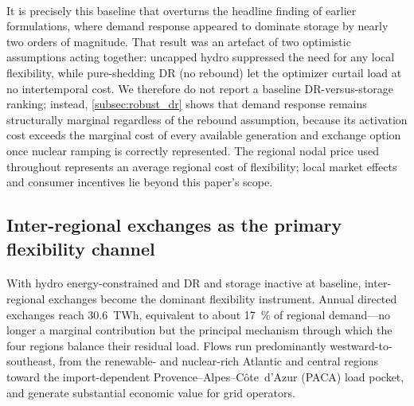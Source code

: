 \documentclass[12pt]{article}
\begin{document}
\paragraph{}
It is precisely this baseline that overturns the headline finding of earlier formulations, where demand response appeared to dominate storage by nearly two orders of magnitude. That result was an artefact of two optimistic assumptions acting together: uncapped hydro suppressed the need for any local flexibility, while pure-shedding DR (no rebound) let the optimizer curtail load at no intertemporal cost. We therefore do not report a baseline DR-versus-storage ranking; instead, \cref{subsec:robust_dr} shows that demand response remains structurally marginal regardless of the rebound assumption, because its activation cost exceeds the marginal cost of every available generation and exchange option once nuclear ramping is correctly represented. The regional nodal price used throughout represents an average regional cost of flexibility; local market effects and consumer incentives lie beyond this paper's scope.

\subsection{Inter-regional exchanges as the primary flexibility channel}
\label{subsec:regional_trading}

\paragraph{}
With hydro energy-constrained and DR and storage inactive at baseline, inter-regional exchanges become the dominant flexibility instrument. Annual directed exchanges reach \SI{30.6}{TWh}, equivalent to about \SI{17}{\percent} of regional demand---no longer a marginal contribution but the principal mechanism through which the four regions balance their residual load. Flows run predominantly westward-to-southeast, from the renewable- and nuclear-rich Atlantic and central regions toward the import-dependent Provence--Alpes--Côte~d'Azur (PACA) load pocket, and generate substantial economic value for grid operators.
\end{document}
